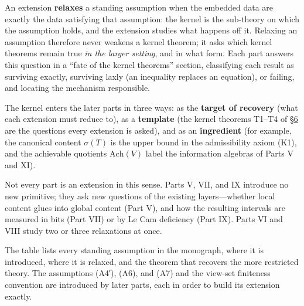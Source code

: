 An extension \textbf{relaxes} a standing assumption when the embedded data are exactly the data satisfying that assumption: the kernel is the sub-theory on which the assumption holds, and the extension studies what happens off it. Relaxing an assumption therefore never weakens a kernel theorem; it asks which kernel theorems remain true \emph{in the larger setting}, and in what form. Each part answers this question in a ``fate of the kernel theorems'' section, classifying each result as surviving exactly, surviving laxly (an inequality replaces an equation), or failing, and locating the mechanism responsible.

The kernel enters the later parts in three ways: as the \textbf{target of recovery} (what each extension must reduce to), as a \textbf{template} (the kernel theorems T1--T4 of \hyperlink{sec:6}{§6} are the questions every extension is asked), and as an \textbf{ingredient} (for example, the canonical content \(\sigma(T)\) is the upper bound in the admissibility axiom (K1), and the achievable quotients \(\mathrm{Ach}(V)\) label the information algebras of Parts V and XI).

Not every part is an extension in this sense. Parts V, VII, and IX introduce no new primitive; they ask new questions of the existing layers---\hspace{0pt}whether local content glues into global content (Part V), and how the resulting intervals are measured in bits (Part VII) or by Le Cam deficiency (Part IX). Parts VI and VIII study two or three relaxations at once.


The table lists every standing assumption in the monograph, where it is introduced, where it is relaxed, and the theorem that recovers the more restricted theory. The assumptions (A4′), (A6), and (A7) and the view-set finiteness convention are introduced by later parts, each in order to build its extension exactly.

